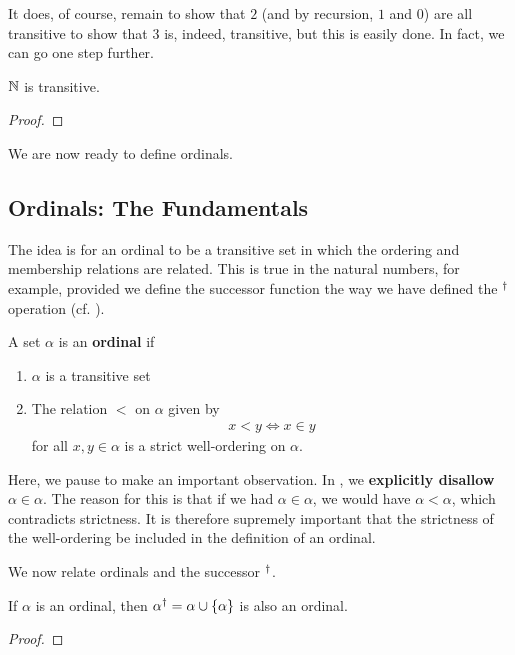 It does, of course, remain to show that $2$ (and by recursion, $1$ and $0$) are all transitive to show that $3$ is, indeed, transitive, but this is easily done. In fact, we can go one step further.

\begin{boxtheorem}\label{Ch3:Thm:Nat_trans}
    $\mathbb{N}$ is transitive.
\end{boxtheorem}
\begin{proof}
    \sorry %
\end{proof}

We are now ready to define ordinals.

\subsection{Ordinals: The Fundamentals}

The idea is for an ordinal to be a transitive set in which the ordering and membership relations are related. This is true in the natural numbers, for example, provided we define the successor function the way we have defined the $^{\dagger}$ operation (cf. ).

\begin{boxdefinition}[Ordinal]\label{Ch3:Def:Ordinal}
    A set $\alpha$ is an \textbf{ordinal} if
    \begin{enumerate}
        \item $\alpha$ is a transitive set
        \item The relation $<$ on $\alpha$ given by
        \begin{align*}
            x < y \iff x \in y
        \end{align*}
        for all $x, y \in \alpha$ is a strict well-ordering on $\alpha$.
    \end{enumerate}
\end{boxdefinition}

Here, we pause to make an important observation. In , we \textbf{explicitly disallow $\alpha \in \alpha$}. The reason for this is that if we had $\alpha \in \alpha$, we would have $\alpha < \alpha$, which contradicts strictness. It is therefore supremely important that the strictness of the well-ordering be included in the definition of an ordinal.

We now relate ordinals and the successor $^{\dagger}$.

\begin{boxlemma}
    If $\alpha$ is an ordinal, then $\alpha^{\dagger} = \alpha \cup \left\{ \alpha \right\}$ is also an ordinal.
\end{boxlemma}
\begin{proof}
    \sorry
\end{proof}

